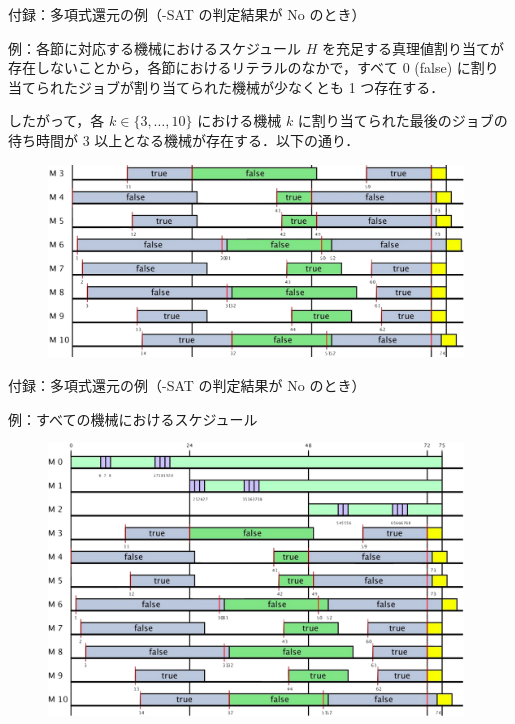 \documentclass[dvipdfmx]{beamer}
\begin{document}
    \begin{frame}{付録：多項式還元の例（{-SAT} の判定結果が No のとき）}
      \begin{exampleblock}{例：各節に対応する機械におけるスケジュール}
        $H$ を充足する真理値割り当てが存在しないことから，各節におけるリテラルのなかで，すベて 0 (false) に割り当てられたジョブが割り当てられた機械が少なくとも 1 つ存在する．

        したがって，各 $k \in \{3,\ldots,10\}$ における機械 $k$ に割り当てられた最後のジョブの待ち時間が $3$ 以上となる機械が存在する．以下の通り．
        \vspace{-4mm}
        \begin{figure}[h]
          \centering
          \includegraphics[width = 11cm]{figure/reductionExample5.pdf}
        \end{figure}
      \end{exampleblock}
    \end{frame}

    \begin{frame}{付録：多項式還元の例（{-SAT} の判定結果が No のとき）}
      \begin{exampleblock}{例：すべての機械におけるスケジュール}
        \begin{figure}[h]
          \centering
          \includegraphics[width = 11cm]{figure/reductionExample6.pdf}
        \end{figure}
      \end{exampleblock}
    \end{frame}
\end{document}
